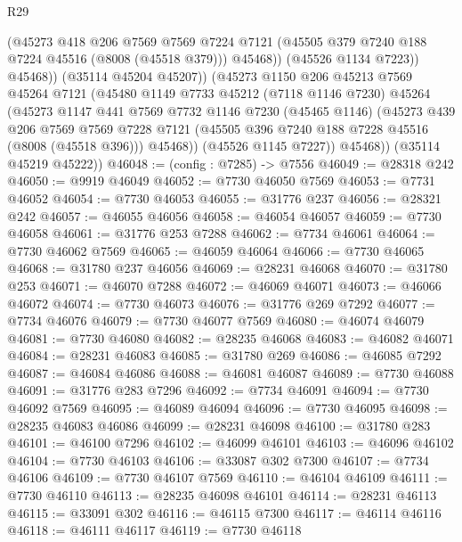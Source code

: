 \begin{lexlean}{R29}
\begin{coremodule}
                  (@45273
                    @418
                    @206
                    @7569
                    @7569
                    @7224
                    @7121
                    (@45505 @379 @7240 @188 @7224 @45516 (@8008 (@45518 @379)))
                    @45468))
                (@45526 @1134 @7223))
              @45468))
          (@35114 @45204 @45207))
        (@45273
          @1150
          @206
          @45213
          @7569
          @45264
          @7121
          (@45480
            @1149
            @7733
            @45212
            (@7118 @1146 @7230)
            @45264
            (@45273
              @1147
              @441
              @7569
              @7732
              @1146
              @7230
              (@45465 @1146)
              (@45273
                @439
                @206
                @7569
                @7569
                @7228
                @7121
                (@45505 @396 @7240 @188 @7228 @45516 (@8008 (@45518 @396)))
                @45468))
            (@45526 @1145 @7227))
          @45468))
      (@35114 @45219 @45222))
@46048 := (config : @7285) -> @7556
@46049 := @28318 @242
@46050 := @9919 @46049
@46052 := @7730 @46050 @7569
@46053 := @7731 @46052
@46054 := @7730 @46053
@46055 := @31776 @237
@46056 := @28321 @242
@46057 := @46055 @46056
@46058 := @46054 @46057
@46059 := @7730 @46058
@46061 := @31776 @253 @7288
@46062 := @7734 @46061
@46064 := @7730 @46062 @7569
@46065 := @46059 @46064
@46066 := @7730 @46065
@46068 := @31780 @237 @46056
@46069 := @28231 @46068
@46070 := @31780 @253
@46071 := @46070 @7288
@46072 := @46069 @46071
@46073 := @46066 @46072
@46074 := @7730 @46073
@46076 := @31776 @269 @7292
@46077 := @7734 @46076
@46079 := @7730 @46077 @7569
@46080 := @46074 @46079
@46081 := @7730 @46080
@46082 := @28235 @46068
@46083 := @46082 @46071
@46084 := @28231 @46083
@46085 := @31780 @269
@46086 := @46085 @7292
@46087 := @46084 @46086
@46088 := @46081 @46087
@46089 := @7730 @46088
@46091 := @31776 @283 @7296
@46092 := @7734 @46091
@46094 := @7730 @46092 @7569
@46095 := @46089 @46094
@46096 := @7730 @46095
@46098 := @28235 @46083 @46086
@46099 := @28231 @46098
@46100 := @31780 @283
@46101 := @46100 @7296
@46102 := @46099 @46101
@46103 := @46096 @46102
@46104 := @7730 @46103
@46106 := @33087 @302 @7300
@46107 := @7734 @46106
@46109 := @7730 @46107 @7569
@46110 := @46104 @46109
@46111 := @7730 @46110
@46113 := @28235 @46098 @46101
@46114 := @28231 @46113
@46115 := @33091 @302
@46116 := @46115 @7300
@46117 := @46114 @46116
@46118 := @46111 @46117
@46119 := @7730 @46118

\end{coremodule}
\end{lexlean}
